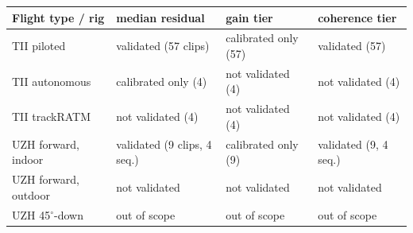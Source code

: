 \begin{tabular}{llll}
\toprule
Flight type / rig & median residual & gain tier & coherence tier \\
\midrule
TII piloted & validated (57 clips) & calibrated only (57) & validated (57) \\
TII autonomous & calibrated only (4) & not validated (4) & not validated (4) \\
TII trackRATM & not validated (4) & not validated (4) & not validated (4) \\
UZH forward, indoor & validated (9 clips, 4 seq.) & calibrated only (9) & validated (9, 4 seq.) \\
UZH forward, outdoor & not validated & not validated & not validated \\
UZH 45$^\circ$-down & out of scope & out of scope & out of scope \\
\bottomrule
\end{tabular}
